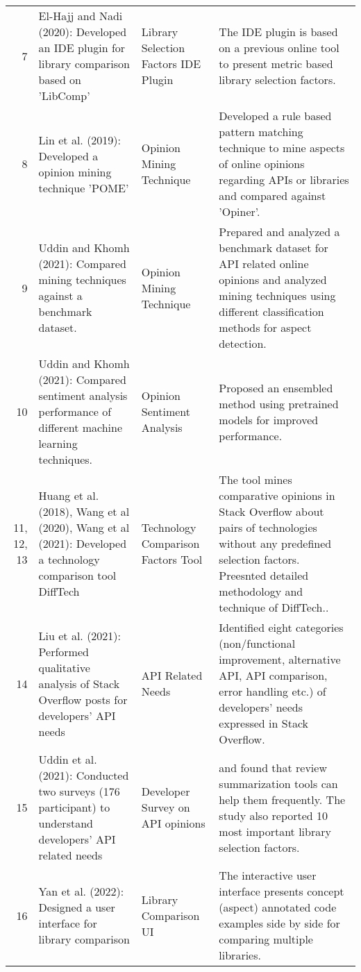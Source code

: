 \begin{table*}[htbp]
\begin{tabular}{rp{18.585em}p{6em}p{28.085em}}
    7 & El-Hajj and Nadi (2020): Developed an IDE plugin for library comparison based on 'LibComp' \cite{el2020libcomp}  & Library Selection Factors IDE Plugin & The IDE plugin is based on a previous online tool to present metric based library selection factors. \\
    8 & Lin et al. (2019): Developed a opinion mining technique 'POME' \cite{lin2019pattern}  & Opinion Mining Technique & Developed a rule based pattern matching technique to mine aspects of online opinions regarding APIs or libraries and compared against 'Opiner'. \\
    9 & Uddin and Khomh (2021): Compared mining techniques against a benchmark dataset. \cite{uddin2019automatic}  & Opinion Mining Technique & Prepared and analyzed a benchmark dataset for API related online opinions and analyzed mining techniques using different classification methods for aspect detection. \\
    10 & Uddin and Khomh (2021): Compared sentiment analysis performance of different machine learning techniques. \cite{uddin2022empirical}  & Opinion Sentiment Analysis & Proposed an ensembled method using pretrained models for improved performance. \\
    \multicolumn{1}{p{.5em}}{11, 12, 13} & Huang et al. (2018), Wang et al (2020), Wang et al (2021): Developed a technology comparison tool DiffTech \cite{huang2018tell, wang2020difftech, wang2021difftech}  & Technology Comparison Factors Tool & The tool mines comparative opinions in Stack Overflow about pairs of technologies without any predefined selection factors. Preesnted detailed methodology and technique of DiffTech.. \\
    14 & Liu et al. (2021): Performed qualitative analysis of Stack Overflow posts for developers' API needs \cite{liu2021api}  & API Related Needs & Identified eight categories (non/functional improvement, alternative API, API comparison, error handling etc.) of developers' needs expressed in Stack Overflow. \\
    15 & Uddin et al. (2021): Conducted two surveys (176 participant) to understand developers' API related needs \cite{uddin2019understanding}  & Developer Survey on API opinions & and found that review summarization tools can help them frequently. The study also reported 10 most important library selection factors. \\
    16 & Yan et al. (2022):  Designed a user interface for library comparison \cite{yan2022concept}  & Library Comparison UI & The interactive user interface presents concept (aspect) annotated code examples side by side for comparing multiple libraries. \\

\end{tabular}
\end{table*}

